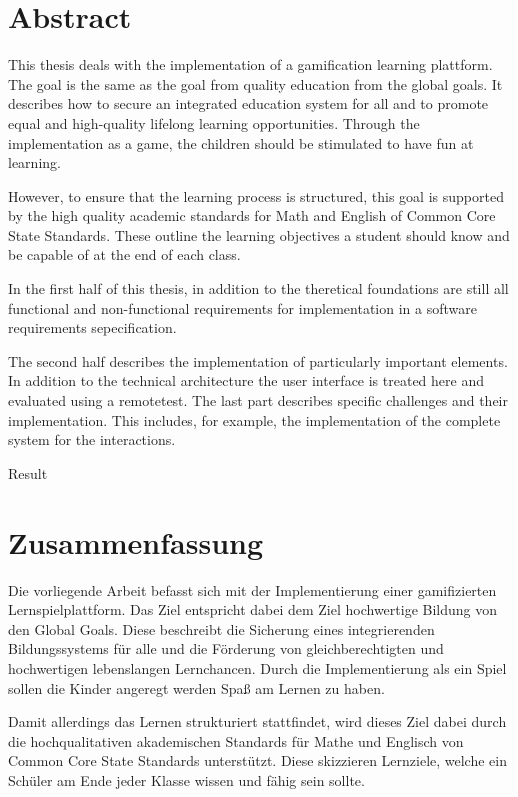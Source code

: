 
\chapter*{Abstract}
	This thesis deals with the implementation of a gamification learning plattform. The goal is the same as the goal from quality education from the global goals. It describes how to secure an integrated education system for all and to promote equal and high-quality lifelong learning opportunities. Through the implementation as a game, the children should be stimulated to have fun at learning.
	
	However, to ensure that the learning process is structured, this goal is supported by the high quality academic standards for Math and English of Common Core State Standards. These outline the learning objectives a student should know and be capable of at the end of each class.
	
	In the first half of this thesis, in addition to the theretical foundations are still all functional and non-functional requirements for implementation in  a software requirements sepecification.
	
	The second half describes the implementation of particularly important elements. In addition to the technical architecture the user interface is treated here and evaluated using a remotetest. The last part describes specific challenges and their implementation. This includes, for example, the implementation of the complete system for the interactions.
	
	Result
	
	
\pagebreak

\chapter*{Zusammenfassung}
	Die vorliegende Arbeit befasst sich mit der Implementierung einer gamifizierten Lernspielplattform. Das Ziel entspricht dabei dem Ziel hochwertige Bildung von den Global Goals. Diese beschreibt die Sicherung eines integrierenden Bildungssystems für alle und die Förderung von gleichberechtigten und hochwertigen lebenslangen Lernchancen. Durch die Implementierung als ein Spiel sollen die Kinder angeregt werden Spaß am Lernen zu haben.
	
	Damit allerdings das Lernen strukturiert stattfindet, wird dieses Ziel dabei durch die hochqualitativen akademischen Standards für Mathe und Englisch von Common Core State Standards unterstützt. Diese skizzieren Lernziele, welche ein Schüler am Ende jeder Klasse wissen und fähig sein sollte.
	
